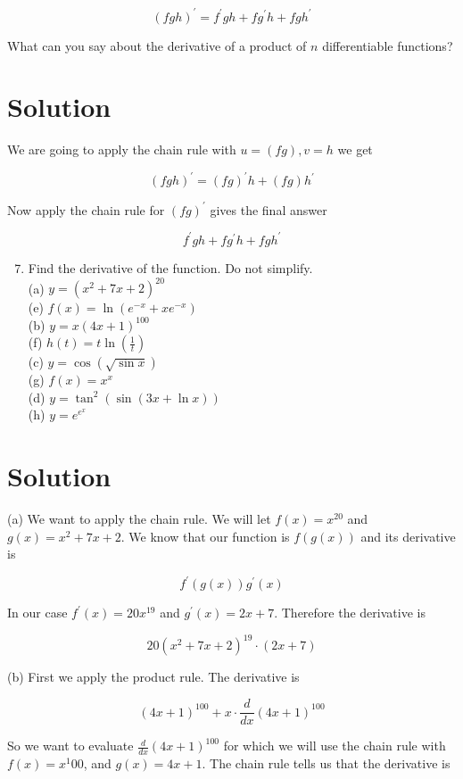 \documentclass[10pt]{article}
\begin{document}
$$
(f g h)^{\prime}=f^{\prime} g h+f g^{\prime} h+f g h^{\prime}
$$

What can you say about the derivative of a product of $n$ differentiable functions?

\section*{Solution}
We are going to apply the chain rule with $u=(f g), v=h$ we get

$$
(f g h)^{\prime}=(f g)^{\prime} h+(f g) h^{\prime}
$$

Now apply the chain rule for $(f g)^{\prime}$ gives the final answer

$$
f^{\prime} g h+f g^{\prime} h+f g h^{\prime}
$$

\begin{enumerate}
  \setcounter{enumi}{6}
  \item Find the derivative of the function. Do not simplify.\\
(a) $y=\left(x^{2}+7 x+2\right)^{20}$\\
(e) $f(x)=\ln \left(e^{-x}+x e^{-x}\right)$\\
(b) $y=x(4 x+1)^{100}$\\
(f) $h(t)=t \ln \left(\frac{1}{t}\right)$\\
(c) $y=\cos (\sqrt{\sin x})$\\
(g) $f(x)=x^{x}$\\
(d) $y=\tan ^{2}(\sin (3 x+\ln x))$\\
(h) $y=e^{e^{x}}$
\end{enumerate}

\section*{Solution}
(a) We want to apply the chain rule. We will let $f(x)=x^{20}$ and $g(x)=x^{2}+7 x+2$. We know that our function is $f(g(x))$ and its derivative is

$$
f^{\prime}(g(x)) g^{\prime}(x)
$$

In our case $f^{\prime}(x)=20 x^{19}$ and $g^{\prime}(x)=2 x+7$. Therefore the derivative is

$$
20\left(x^{2}+7 x+2\right)^{19} \cdot(2 x+7)
$$

(b) First we apply the product rule. The derivative is

$$
(4 x+1)^{100}+x \cdot \frac{d}{d x}(4 x+1)^{100}
$$

So we want to evaluate $\frac{d}{d x}(4 x+1)^{100}$ for which we will use the chain rule with $f(x)=x^{1} 00$, and $g(x)=4 x+1$. The chain rule tells us that the derivative is
\end{document}

